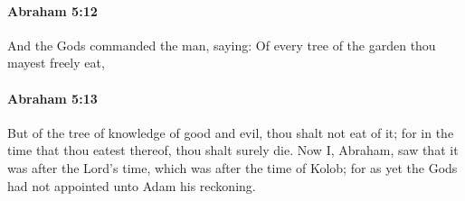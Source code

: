 
		\paragraph{Abraham 5:12} %
			\label{ABRAHAM-5-12}

			And the Gods commanded the man, saying: Of every tree of the garden thou mayest freely eat,


		\paragraph{Abraham 5:13} %
			\label{ABRAHAM-5-13}

			But of the tree of knowledge of good and evil, thou shalt not eat of it; for in the time that thou eatest thereof, thou shalt surely die.  Now I, Abraham, saw that it was after the Lord's time, which was after the time of Kolob; for as yet the Gods had not appointed unto Adam his reckoning.

